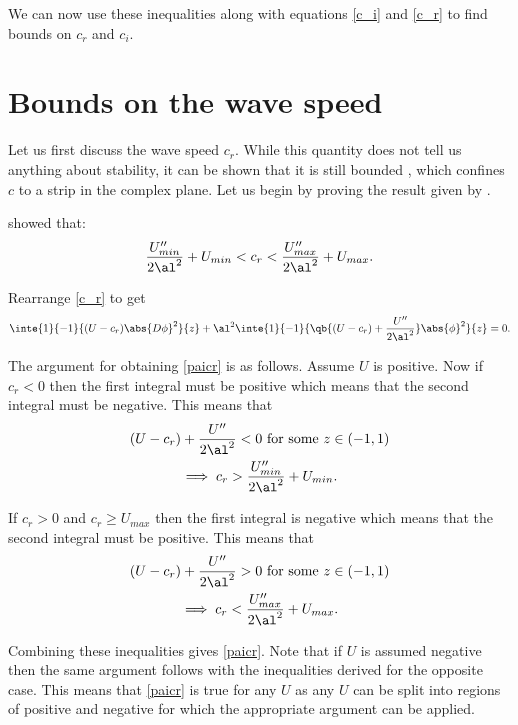 We can now use these inequalities along with equations \eqref{c_i} and \eqref{c_r} to find bounds on $ c_r$ and $ c_i$.

\section{Bounds on the wave speed}
Let us first discuss the wave speed $ c_r $. While this quantity does not tell us anything about stability, it can be shown that it is still bounded \citep{synge1938hydrodynamical, pai1954generalization, joseph1968eigenvalue, joseph1969eigenvalue}, which confines $ c $ to a strip in the complex plane. Let us begin by proving the result given by \citet{pai1954generalization}.

\citet{pai1954generalization} showed that:
\begin{equation}
    \frac{U''_{min}}{2 \al^2} + U_{min} < c_r < \frac{U''_{max}}{2 \al^2} + U_{max}.
    \label{paicr}
\end{equation}

\proof
Rearrange \eqref{c_r} to get
\begin{equation}
    \inte{1}{-1}{(U - c_r) \abs{D \phi}^2}{z} + \al^2 \inte{1}{-1}{\qb{(U - c_r) + \frac{U''}{2 \al^2}}\abs{\phi}^2}{z} = 0.
\end{equation}

The argument for obtaining \eqref{paicr} is as follows. Assume $ U $ is positive. Now if $ c_r < 0$ then the first integral must be positive which means that the second integral must be negative. This means that
\begin{gather}
    (U - c_r) + \frac{U''}{2 \al^2} < 0 \text{ for some } z \in (-1, 1) \nonumber\\
    \implies c_r > \frac{U''_{min}}{2 \al^2} + U_{min}. 
\end{gather}

If $ c_r > 0 $ and $ c_r \geq U_{max} $ then the first integral is negative which means that the second integral must be positive. This means that
\begin{gather}
    (U - c_r) + \frac{U''}{2 \al^2} > 0 \text{ for some } z \in (-1, 1) \nonumber\\
    \implies c_r < \frac{U''_{max}}{2 \al^2} + U_{max}. 
\end{gather}

Combining these inequalities gives \eqref{paicr}. Note that if $ U $ is assumed negative then the same argument follows with the inequalities derived for the opposite case. This means that \eqref{paicr} is true for any $ U $ as any $ U $ can be split into regions of positive and negative for which the appropriate argument can be applied.

